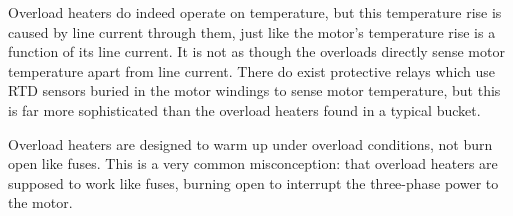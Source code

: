 Overload heaters do indeed operate on temperature, but this temperature rise is caused by line current through them, just like the motor's temperature rise is a function of its line current.  It is not as though the overloads directly sense motor temperature apart from line current.  There do exist protective relays which use RTD sensors buried in the motor windings to sense motor temperature, but this is far more sophisticated than the overload heaters found in a typical bucket.

\vskip 10pt

Overload heaters are designed to warm up under overload conditions, not burn open like fuses.  This is a very common misconception: that overload heaters are supposed to work like fuses, burning open to interrupt the three-phase power to the motor.




